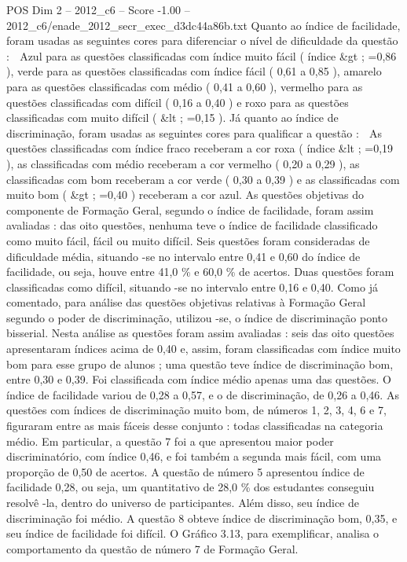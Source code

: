\begin{textsample}{POS Dim 2 – 2012\_c6 – Score -1.00 – 2012\_c6/enade\_2012\_secr\_exec\_d3dc44a86b.txt}
Quanto ao índice de facilidade, foram usadas as seguintes cores para diferenciar o nível de dificuldade da questão :  Azul para as questões classificadas com índice muito fácil ( índice \&gt ; =0,86 ), verde para as questões classificadas com índice fácil ( 0,61 a 0,85 ), amarelo para as questões classificadas com médio ( 0,41 a 0,60 ), vermelho para as questões classificadas com difícil ( 0,16 a 0,40 ) e roxo para as questões classificadas com muito difícil ( \&lt ; =0,15 ).
Já quanto ao índice de discriminação, foram usadas as seguintes cores para qualificar a questão :  As questões classificadas com índice fraco receberam a cor roxa ( índice \&lt ; =0,19 ), as classificadas com médio receberam a cor vermelho ( 0,20 a 0,29 ), as classificadas com bom receberam a cor verde ( 0,30 a 0,39 ) e as classificadas com muito bom ( \&gt ; =0,40 ) receberam a cor azul.
As questões objetivas do componente de Formação Geral, segundo o índice de facilidade, foram assim avaliadas : das oito questões, nenhuma teve o índice de facilidade classificado como muito fácil, fácil ou muito difícil.
Seis questões foram consideradas de dificuldade média, situando -se no intervalo entre 0,41 e 0,60 do índice de facilidade, ou seja, houve entre 41,0 \% e 60,0 \% de acertos.
Duas questões foram classificadas como difícil, situando -se no intervalo entre 0,16 e 0,40.
Como já comentado, para análise das questões objetivas relativas à Formação Geral segundo o poder de discriminação, utilizou -se, o índice de discriminação ponto bisserial.
Nesta análise as questões foram assim avaliadas : seis das oito questões apresentaram índices acima de 0,40 e, assim, foram classificadas com índice muito bom para esse grupo de alunos ; uma questão teve índice de discriminação bom, entre 0,30 e 0,39.
Foi classificada com índice médio apenas uma das questões.
O índice de facilidade variou de 0,28 a 0,57, e o de discriminação, de 0,26 a 0,46.
As questões com índices de discriminação muito bom, de números 1, 2, 3, 4, 6 e 7, figuraram entre as mais fáceis desse conjunto : todas classificadas na categoria médio.
Em particular, a questão 7 foi a que apresentou maior poder discriminatório, com índice 0,46, e foi também a segunda mais fácil, com uma proporção de 0,50 de acertos.
A questão de número 5 apresentou índice de facilidade 0,28, ou seja, um quantitativo de 28,0 \% dos estudantes conseguiu resolvê -la, dentro do universo de participantes.
Além disso, seu índice de discriminação foi médio.
A questão 8 obteve índice de discriminação bom, 0,35, e seu índice de facilidade foi difícil.
O Gráfico 3.13, para exemplificar, analisa o comportamento da questão de número 7 de Formação Geral.

\end{textsample}

